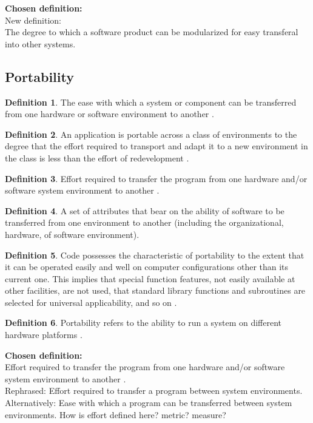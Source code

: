 \documentclass[letterpaper,cleveref]{lipics-v2019}
\theoremstyle{definition}
\newtheorem{defn}{Definition}
\begin{document}
\textbf{Chosen definition:}\\
New definition:\\ The degree to which a software product can be modularized for easy transferal into other systems.\\




\subsection{Portability}
\begin{defn}
The ease with which a system or component can be transferred from one hardware or software environment to another \cite{IEEEStdGlossarySET1990}. \\
\end{defn}
\begin{defn}
An application is portable across a class of environments to the degree that the effort required to transport and adapt it to a new environment in the class is less than the effort of redevelopment \cite{mooney1990strategies}.\\
\end{defn}
\begin{defn}
Effort required to transfer the program from one hardware and/or software system environment to another \cite{pressman2005software}.\\
\end{defn}
\begin{defn}
A set of attributes that bear on the ability of software to be transferred from one environment to another (including the organizational, hardware, of software environment)\cite{pfleeger2006software}.\\
\end{defn}
\begin{defn}
Code possesses the characteristic of portability to the extent that it can be operated easily and well on computer configurations other than its current one. This implies that special function features, not easily available at other facilities, are not used, that standard library functions and subroutines are selected for universal applicability, and so on \cite{boehm2007software}.
\end{defn}
\begin{defn}
Portability refers to the ability to run a system on different hardware platforms \cite{ghezzi1991fundamentals}.
\end{defn}
\textbf{Chosen definition:}\\ Effort required to transfer the program from one hardware and/or software system environment to another \cite{pressman2005software}.\\
Rephrased: Effort required to transfer a program between system environments.\\
Alternatively: Ease with which a program can be transferred between system environments.
How is effort defined here? metric? measure?\\
\end{document}
